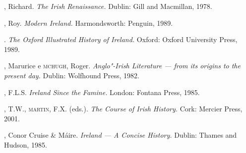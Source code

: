 \begin{bibliohedra}

, Richard. \textit{The Irish Renaissance.} Dublin: Gill and
Macmillan, 1978.

, Roy. \textit{Modern Ireland.} Harmondsworth: Penguin, 1989. 

\titidem. \textit{The Oxford Illustrated History of Ireland.} Oxford:
Oxford University Press, 1989.

, Marurice e \textsc{mchugh}, Roger. \textit{Anglo"-Irish Literature --- from
its origins to the present day.} Dublin: Wolfhound Press, 1982.

, F.L.S. \textit{Ireland Since the Famine.} London: Fontana
Press, 1985.

, T.W., \textsc{martin}, F.X. (eds.). \textit{The Course of Irish History.}
Cork: Mercier Press, 2001.

, Conor Cruise \& Máire. \textit{Ireland --- A Concise History.}
Dublin: Thames and Hudson, 1985.

\end{bibliohedra}

